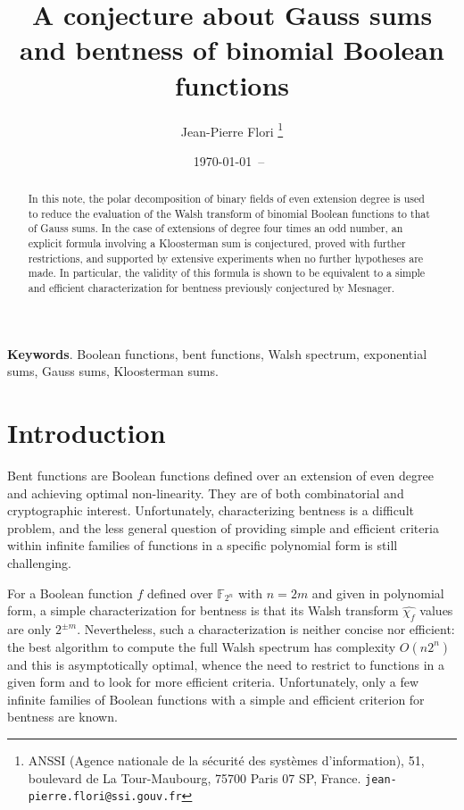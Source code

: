 \documentclass[a4paper]{article}
\title{A conjecture about Gauss sums and bentness of binomial Boolean functions}
\author{Jean-Pierre Flori
  \thanks{ANSSI (Agence nationale de la sécurité des systèmes d'information),
    51, boulevard de La Tour-Maubourg,
    75700 Paris 07 SP, France.
    \texttt{jean-pierre.flori@ssi.gouv.fr}}
}
\date{\today~--~\currenttime}
\newcommand{\GF}[2][2]{\mathbb{F}_{#1^{#2}}}
\newcommand{\Wa}[1]{\widehat{\chi_{#1}}}
\begin{document}
\maketitle

\begin{abstract}
  In this note, the polar decomposition of binary fields of even extension degree is
  used to reduce the evaluation of the Walsh transform of binomial Boolean functions
  to that of Gauss sums.
  In the case of extensions of degree four times an odd number, an explicit formula involving a Kloosterman sum is conjectured,
  proved with further restrictions, and supported by extensive experiments when
  no further hypotheses are made.
  In particular, the validity of this formula is shown to be equivalent
  to a simple and efficient characterization for bentness
  previously conjectured by Mesnager.
\end{abstract}

\noindent
{\bf Keywords}. Boolean functions, bent functions, Walsh spectrum, exponential sums, Gauss sums, Kloosterman sums.


\section{Introduction}
\label{sec:introduction}

Bent functions are Boolean functions defined over an extension of even
degree and achieving optimal non-linearity.
They are of both combinatorial and cryptographic interest.
Unfortunately, characterizing bentness is a difficult problem,
and the less general question of providing simple and efficient
criteria within infinite families of functions in a specific polynomial form
is still challenging.

For a Boolean function $f$ defined over $\GF{n}$ with $n = 2 m$ and
given in polynomial form, a simple characterization for bentness
is that its Walsh transform $\Wa{f}$ values are only $2^{\pm m}$.
Nevertheless, such a characterization is neither concise nor efficient:
the best algorithm to compute the full Walsh spectrum has complexity $O(n 2^n)$
and this is asymptotically optimal, whence the need to restrict to functions
in a given form and to look for more efficient criteria.
Unfortunately, only a few infinite families of Boolean functions
with a simple and efficient criterion for bentness are known.
\end{document}
